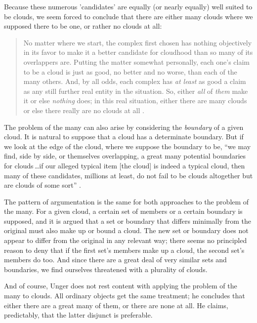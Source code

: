 \documentclass[11pt]{article}
\newenvironment{squote}{%
	\begin{quote}\begin{singlespace}%
	}{%
	\end{singlespace}\end{quote}}
\begin{document}
\begin{spacing}{1.5}
Because these numerous 'candidates' are equally (or nearly equally)
well suited to be clouds, we seem forced to conclude that there are
either many clouds where we supposed there to be one, or rather no
clouds at all:

\begin{squote}
No matter where we start, the complex first chosen has nothing
objectively in its favor to make it a better candidate for cloudhood
than so many of its overlappers are.  Putting the matter somewhat
personally, each one's claim to be a cloud is just as good, no better
and no worse, than each of the many others.  And, by all odds, each
complex has \emph{at least} as good a claim as any still further real
entity in the situation.  So, either \emph{all} of \emph{them} make it
or else \emph{nothing} does; in this real situation, either there are
many clouds or else there really are no clouds at all
\citep[415]{unger1980a}.
\end{squote}

The problem of the many can also arise by considering the {\em
  boundary} of a given cloud.  It is natural to suppose that a cloud
has a determinate boundary.  But if we look at the edge of the cloud,
where we suppose the boundary to be, ``we may find, side by side, or
themselves overlapping, a great many potential boundaries for
clouds\,\ldots if our alleged typical item {[}the cloud{]} is indeed
a typical cloud, then many of these candidates, millions at least, do
not fail to be clouds altogether but are clouds of some
sort'' \citep[420--421]{unger1980a}.

The pattern of argumentation is the same for both approaches to the
problem of the many.  For a given cloud, a certain set of members or a
certain boundary is supposed, and it is argued that a set or boundary
that differs minimally from the original must also make up or bound a
cloud.  The new set or boundary does not appear to differ from the
original in any relevant way; there seems no principled reason to deny
that if the first set's members make up a cloud, the second set's
members do too.  And since there are a great deal of very similar sets
and boundaries, we find ourselves threatened with a plurality of
clouds.

And of course, Unger does not rest content with applying the problem
of the many to clouds.  All ordinary objects get the same treatment;
he concludes that either there are a great many of them, or there are
none at all.  He claims, predictably, that the latter disjunct is
preferable.


\end{spacing}
\end{document}
